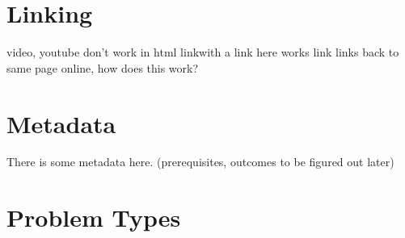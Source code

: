 \documentclass{ximera}
\begin{document}
\section{Linking}

video, youtube don't work in html
link{with a link here} works
link{} links back to same page online, how does this work?

\link{} %



\section{Metadata}

There is some metadata here. (prerequisites, outcomes to be figured out later)





\section{Problem Types}
\end{document}
